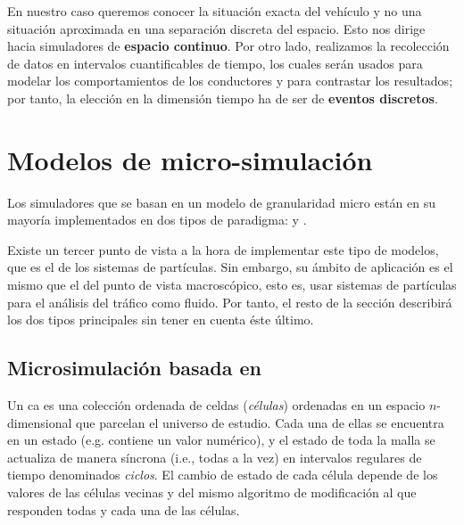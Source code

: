 En nuestro caso queremos conocer la situación exacta del vehículo y no una situación aproximada en una separación discreta del espacio. Esto nos dirige hacia simuladores de \textbf{espacio continuo}. Por otro lado, realizamos la recolección de datos en intervalos cuantificables de tiempo, los cuales serán usados para modelar los comportamientos de los conductores y para contrastar los resultados; por tanto, la elección en la dimensión tiempo ha de ser de \textbf{eventos discretos}.

\section{Modelos de micro-simulación}

Los simuladores que se basan en un modelo de granularidad micro están en su mayoría implementados en dos tipos de paradigma:  y .

Existe un tercer punto de vista a la hora de implementar este tipo de modelos, que es el de los sistemas de partículas. Sin embargo, su ámbito de aplicación es el mismo que el del punto de vista macroscópico, esto es, usar sistemas de partículas para el análisis del tráfico como fluido. Por tanto, el resto de la sección describirá los dos tipos principales sin tener en cuenta éste último.

\subsection{Microsimulación basada en }

Un \Acrfull{ca} es una colección ordenada de celdas (\textit{células}) ordenadas en un espacio $n$-dimensional que parcelan el universo de estudio. Cada una de ellas se encuentra en un estado (e.g. contiene un valor numérico), y el estado de toda la malla se actualiza de manera síncrona (i.e., todas a la vez) en intervalos regulares de tiempo denominados \textit{ciclos}. El cambio de estado de cada célula depende de los valores de las células vecinas y del mismo algoritmo de modificación al que responden todas y cada una de las células.

